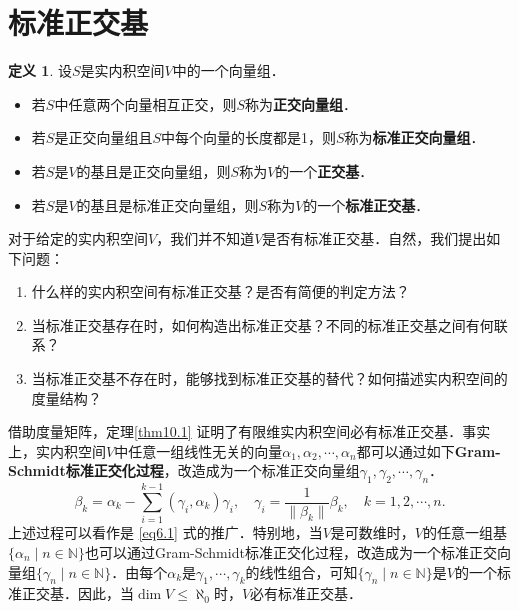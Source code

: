 \documentclass[a4paper,fontset=windows]{ctexbook}
\theoremstyle{definition}
\newtheorem{definition}{定义}[chapter]
\renewcommand{\le}{\leqslant}
\begin{document}
\clearpage\section{标准正交基}

\begin{definition}
设$S$是实内积空间$V$中的一个向量组．
\begin{itemize}
\item 若$S$中任意两个向量相互正交，则$S$称为{\bf 正交向量组}．

\item 若$S$是正交向量组且$S$中每个向量的长度都是1，则$S$称为{\bf 标准正交向量组}．

\item 若$S$是$V$的基且是正交向量组，则$S$称为$V$的一个{\bf 正交基}．

\item 若$S$是$V$的基且是标准正交向量组，则$S$称为$V$的一个{\bf 标准正交基}．
\end{itemize}
\end{definition}

对于给定的实内积空间$V$，我们并不知道$V$是否有标准正交基．自然，我们提出如下问题：
\begin{enumerate}
\item 什么样的实内积空间有标准正交基？是否有简便的判定方法？

\item 当标准正交基存在时，如何构造出标准正交基？不同的标准正交基之间有何联系？

\item 当标准正交基不存在时，能够找到标准正交基的替代？如何描述实内积空间的度量结构？
\end{enumerate}

借助度量矩阵，定理\ref{thm10.1} 证明了有限维实内积空间必有标准正交基．事实上，实内积空间$V$中任意一组线性无关的向量$\alpha_1,\alpha_2,\cdots,\alpha_n$都可以通过如下{\bf Gram-Schmidt标准正交化过程}，改造成为一个标准正交向量组$\gamma_1,\gamma_2,\cdots,\gamma_n$．
\begin{equation}\label{eq10.2}
\beta_k=\alpha_k-\sum\limits_{i=1}^{k-1}(\gamma_i,\alpha_k)\gamma_i,\quad\gamma_i=\frac{1}{\|\beta_k\|}\beta_k,\quad k=1,2,\cdots,n.
\end{equation}
上述过程可以看作是 \eqref{eq6.1} 式的推广．特别地，当$V$是可数维时，$V$的任意一组基$\{\alpha_n\mid n\in\mathbb{N}\}$也可以通过Gram-Schmidt标准正交化过程，改造成为一个标准正交向量组$\{\gamma_n\mid n\in\mathbb{N}\}$．由每个$\alpha_k$是$\gamma_1,\cdots,\gamma_k$的线性组合，可知$\{\gamma_n\mid n\in\mathbb{N}\}$是$V$的一个标准正交基．因此，当$\dim V\le\aleph_0$时，$V$必有标准正交基．
\end{document}
